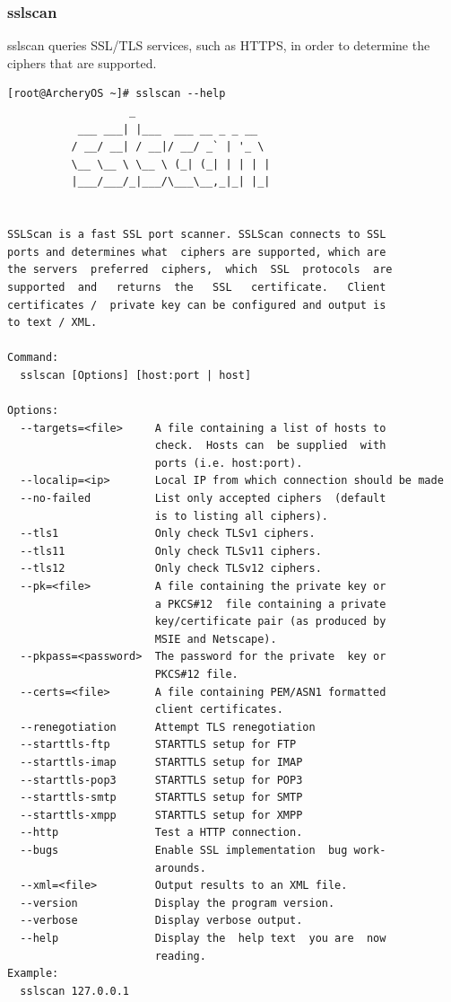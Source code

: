 \documentclass{article}
\begin{document}
\subsubsection{sslscan}
sslscan queries SSL/TLS services, such as HTTPS, in order to determine the ciphers that are supported.
\begin{lstlisting}
[root@ArcheryOS ~]# sslscan --help
                   _
           ___ ___| |___  ___ __ _ _ __
          / __/ __| / __|/ __/ _` | '_ \
          \__ \__ \ \__ \ (_| (_| | | | |
          |___/___/_|___/\___\__,_|_| |_|


SSLScan is a fast SSL port scanner. SSLScan connects to SSL
ports and determines what  ciphers are supported, which are
the servers  preferred  ciphers,  which  SSL  protocols  are
supported  and   returns  the   SSL   certificate.   Client
certificates /  private key can be configured and output is
to text / XML.

Command:
  sslscan [Options] [host:port | host]

Options:
  --targets=<file>     A file containing a list of hosts to
                       check.  Hosts can  be supplied  with
                       ports (i.e. host:port).
  --localip=<ip>       Local IP from which connection should be made
  --no-failed          List only accepted ciphers  (default
                       is to listing all ciphers).
  --tls1               Only check TLSv1 ciphers.
  --tls11              Only check TLSv11 ciphers.
  --tls12              Only check TLSv12 ciphers.
  --pk=<file>          A file containing the private key or
                       a PKCS#12  file containing a private
                       key/certificate pair (as produced by
                       MSIE and Netscape).
  --pkpass=<password>  The password for the private  key or
                       PKCS#12 file.
  --certs=<file>       A file containing PEM/ASN1 formatted
                       client certificates.
  --renegotiation      Attempt TLS renegotiation
  --starttls-ftp       STARTTLS setup for FTP
  --starttls-imap      STARTTLS setup for IMAP
  --starttls-pop3      STARTTLS setup for POP3
  --starttls-smtp      STARTTLS setup for SMTP
  --starttls-xmpp      STARTTLS setup for XMPP
  --http               Test a HTTP connection.
  --bugs               Enable SSL implementation  bug work-
                       arounds.
  --xml=<file>         Output results to an XML file.
  --version            Display the program version.
  --verbose            Display verbose output.
  --help               Display the  help text  you are  now
                       reading.
Example:
  sslscan 127.0.0.1
\end{lstlisting}
\end{document}

